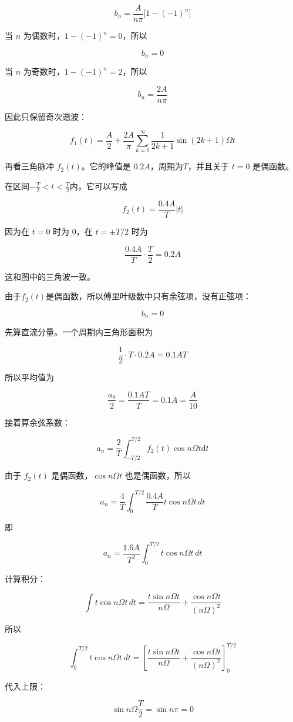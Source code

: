 \documentclass[UTF8]{ctexart}
\begin{document}
\begin{solution}
$$
b_n=\frac{A}{n\pi}\bigl[1-(-1)^n\bigr]
$$

当 $n$ 为偶数时，$1-(-1)^n=0$，所以

$$
b_n=0
$$

当 $n$ 为奇数时，$1-(-1)^n=2$，所以

$$
b_n=\frac{2A}{n\pi}
$$

因此只保留奇次谐波：

$$
f_1(t)=\frac{A}{2}
+\frac{2A}{\pi}\sum_{k=0}^{\infty}
\frac{1}{2k+1}\sin(2k+1)\Omega t
$$

再看三角脉冲 $f_2(t)$。它的峰值是 $0.2A$，周期为$T$，并且关于 $t=0$ 是偶函数。

在区间$-\frac{T}{2}<t<\frac{T}{2}$内，它可以写成

$$
f_2(t)=\frac{0.4A}{T}|t|
$$

因为在 $t=0$ 时为 $0$，在 $t=\pm T/2$ 时为

$$
\frac{0.4A}{T}\cdot\frac{T}{2}=0.2A
$$

这和图中的三角波一致。

由于$f_2(t)$是偶函数，所以傅里叶级数中只有余弦项，没有正弦项：

$$
b_n=0
$$

先算直流分量。一个周期内三角形面积为

$$
\frac{1}{2}\cdot T\cdot 0.2A=0.1AT
$$

所以平均值为

$$
\frac{a_0}{2}
=\frac{0.1AT}{T}
=0.1A
=\frac{A}{10}
$$

接着算余弦系数：

$$
a_n=\frac{2}{T}\int_{-T/2}^{T/2}f_2(t)\cos n\Omega t\mathrm{d}t
$$

由于 $f_2(t)$ 是偶函数，$\cos n\Omega t$ 也是偶函数，所以

$$
a_n=\frac{4}{T}\int_0^{T/2}
\frac{0.4A}{T}t\cos n\Omega t\,dt
$$

即

$$
a_n=\frac{1.6A}{T^2}\int_0^{T/2}t\cos n\Omega t\,dt
$$

计算积分：

$$
\int t\cos n\Omega t\,dt
=\frac{t\sin n\Omega t}{n\Omega}
+\frac{\cos n\Omega t}{(n\Omega)^2}
$$

所以

$$
\int_0^{T/2}t\cos n\Omega t\,dt
=\left[
\frac{t\sin n\Omega t}{n\Omega}
+\frac{\cos n\Omega t}{(n\Omega)^2}
\right]_0^{T/2}
$$

代入上限：

$$
\sin n\Omega\frac{T}{2}=\sin n\pi=0
$$


\end{solution}
\end{document}
